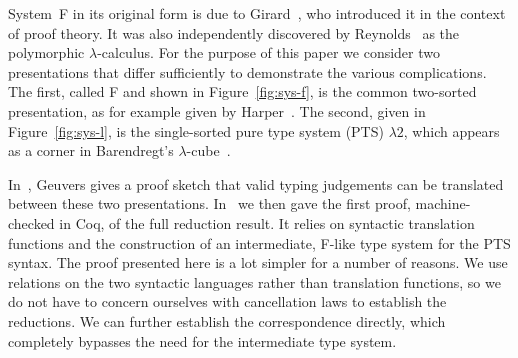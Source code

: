 \documentclass[a4paper,UKenglish]{lipics-v2016}
\newcommand{\SysL}{$\lambda2$\xspace}
\theoremstyle{plain}
\begin{document}

System~F in its original form is due to Girard~\cite{Girard1972, Girard1989}, who introduced it in the context of proof theory.
It was also independently discovered by Reynolds~\cite{DBLP:conf/programm/Reynolds74} as the polymorphic $\lambda$-calculus.
For the purpose of this paper we consider two presentations that differ sufficiently to demonstrate the various complications.
The first, called F and shown in Figure~\ref{fig:sys-f}, is the common two-sorted presentation, as for example given by Harper~\cite{Harper2013}.
The second, given in Figure~\ref{fig:sys-l}, is the single-sorted pure type system (PTS) \SysL, which appears as a corner in Barendregt's $\lambda$-cube~\cite{DBLP:journals/jfp/Barendregt91}.

In~\cite{Geuvers1993}, Geuvers gives a proof sketch that valid typing judgements can be translated between these two presentations.
In~\cite{KaiserEtAl:2017:sysf_pts_equiv_coq} we then gave the first proof, machine-checked in Coq, of the full reduction result.
It relies on syntactic translation functions and the construction of an intermediate, F-like type system for the PTS syntax.
The proof presented here is a lot simpler for a number of reasons.
We use relations on the two syntactic languages rather than translation functions, so we do not have to concern ourselves with cancellation laws to establish the reductions.
We can further establish the correspondence directly, which completely bypasses the need for the intermediate type system.
\end{document}
